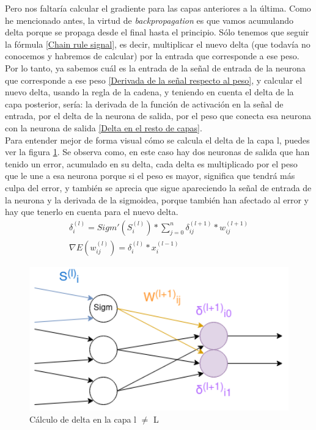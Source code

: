 Pero nos faltaría calcular el gradiente para las capas anteriores a la última. Como he mencionado antes, la virtud de \textit{backpropagation} es que vamos acumulando delta porque se propaga desde el final hasta el principio. Sólo tenemos que seguir la fórmula \ref{Chain rule signal}, es decir, multiplicar el nuevo delta (que todavía no conocemos y habremos de calcular) por la entrada que corresponde a ese peso. 
\\
Por lo tanto, ya sabemos cuál es la entrada de la señal  de entrada de la neurona que corresponde a ese peso \ref{Derivada de la señal respecto al peso}, y calcular el nuevo delta, usando la regla de la cadena, y teniendo en cuenta el delta de la capa posterior, sería: la derivada de la función de activación en la señal de entrada, por el delta de la neurona de salida, por el peso que conecta esa neurona con la neurona de salida \ref{Delta en el resto de capas}. 
\\
Para entender mejor de forma visual cómo se calcula el delta de la capa l, puedes ver la figura \ref{Delta en la capa l}. Se observa como, en este caso hay dos neuronas de salida que han tenido un error, acumulado en su delta, cada delta es multiplicado por el peso que le une a esa neurona porque si el peso es mayor, significa que tendrá más culpa del error, y también se aprecia que sigue apareciendo la señal de entrada de la neurona y la derivada de la sigmoidea, porque también han afectado al error y hay que tenerlo en cuenta para el nuevo delta.
\begin{subequations}
	\begin{eqnarray}
		\delta_{i}^{(l)} = Sigm'(S_{i}^{(l)}) * \sum_{j=0}^{n} \delta_{ij}^{(l+1)} * w_{ij}^{(l+1)} \label{Delta en el resto de capas} \\
		\nabla E(w_{ij}^{(l)}) = \delta_{i}^{(l)}  * x_{i}^{(l-1)} \label{Gradiente para las neuronas del resto de capas}
	\end{eqnarray}
\end{subequations}

\begin{figure}[H]
	\centering
	\includegraphics[width=15cm]{archivos/imagenes/Calculo-del-delta-en-la-capa-l.png}
	\caption{Cálculo de delta en la capa l $\neq$ L}
	\label{Delta en la capa l}
\end{figure}

